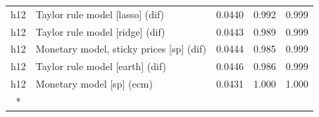 \begin{ThreePartTable}
\begin{longtable}[t]{cp{5.5cm}ccc}
h12 & \raggedright Taylor rule model [lasso] (dif) & 0.0440 & 0.992 & 0.999\\
h12 & \raggedright Taylor rule model [ridge] (dif) & 0.0443 & 0.989 & 0.999\\
h12 & \raggedright Monetary model, sticky prices [sp] (dif) & 0.0444 & 0.985 & 0.999\\
h12 & \raggedright Taylor rule model [earth] (dif) & 0.0446 & 0.986 & 0.999\\
h12 & \raggedright Monetary model [sp] (ecm) & 0.0431 & 1.000 & 1.000\\*
\end{longtable}
\end{ThreePartTable}
\endgroup{}
